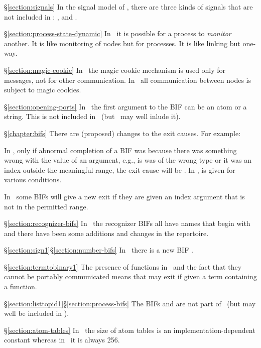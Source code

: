 \begin{Lentry}
\item[\S\ref{section:signals}]
In the signal model of \OldErlang, there are three kinds of signals that are not included
in \StdErlang: ,  and
.

\item[\S\ref{section:process-state-dynamic}]
In \StdErlang\ it is possible for a process to \emph{monitor} another. It is like
monitoring of nodes but for processes.  It is like linking but one-way.

\item[\S\ref{section:magic-cookie}]
In \OldErlang\ the magic cookie mechanism is used only for messages, not for other communication.
In \StdErlang\ all communication between nodes is subject to magic cookies.

\item[\S\ref{section:opening-ports}]
In \OldErlang\ the first argument to the BIF  can be an atom or
a string.  This is not included in \StdErlang\ (but \NewErlang\ may well inlude it).

\item[\S\ref{chapter:bifs}]
There are (proposed) changes to the exit causes.  For example:

In \StdErlang, only if abnormal completion of a BIF was because there was something
wrong with the
value of an argument, e.g., is was of the wrong type or it was an index
outside the meaningful range, the exit cause will be .  In \OldErlang,
 is given for various conditions.

In \StdErlang\ some BIFs will give a new exit  if they are given an
index argument that is not in the permitted range.

\item[\S\ref{section:recognizer-bifs}]
In \StdErlang\ the recognizer BIFs all have names that begin with  and there
have been some additions and changes in the repertoire.

\item[\ifStd\S\ref{section:sign1}\fi\ifOld\S\ref{section:number-bifs}\fi]
In \StdErlang\ there is a new BIF .

\item[\S\ref{section:termtobinary1}]
The presence of functions in \StdErlang\ and the fact that they cannot be portably
communicated means that  may exit if given a term containing a
function.

\item[\ifOld\S\ref{section:listtopid1}\fi\ifStd\S\ref{section:process-bifs}\fi]
The BIFs  and  are not part of \StdErlang\
(but may well be included in \NewErlang).

\item[\S\ref{section:atom-tables}]
In \StdErlang\ the size of atom tables is an implementation-dependent constant
whereas in \OldErlang\ it is always 256.
\end{Lentry}
